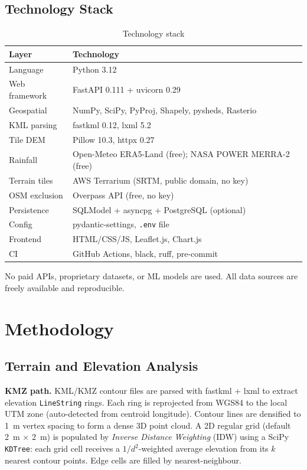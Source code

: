 \documentclass[manuscript,screen,review,nonacm]{acmart}
\begin{document}
\subsection{Technology Stack}

\begin{table}[h]
  \caption{Technology stack}
  \label{tab:stack}
  \begin{tabular}{p{2.5cm}p{4.7cm}}
    \toprule
    Layer & Technology \\
    \midrule
    Language & Python 3.12 \\
    Web framework & FastAPI 0.111 + uvicorn 0.29 \\
    Geospatial & NumPy, SciPy, PyProj, Shapely, pysheds, Rasterio \\
    KML parsing & fastkml 0.12, lxml 5.2 \\
    Tile DEM & Pillow 10.3, httpx 0.27 \\
    Rainfall & Open-Meteo ERA5-Land (free); NASA POWER MERRA-2 (free) \\
    Terrain tiles & AWS Terrarium (SRTM, public domain, no key) \\
    OSM exclusion & Overpass API (free, no key) \\
    Persistence & SQLModel + asyncpg + PostgreSQL (optional) \\
    Config & pydantic-settings, \texttt{.env} file \\
    Frontend & HTML/CSS/JS, Leaflet.js, Chart.js \\
    CI & GitHub Actions, black, ruff, pre-commit \\
    \bottomrule
  \end{tabular}
\end{table}

No paid APIs, proprietary datasets, or ML models are used. All data
sources are freely available and reproducible.

\section{Methodology}
\label{sec:methodology}

\subsection{Terrain and Elevation Analysis}

\textbf{KMZ path.} KML/KMZ contour files are parsed with fastkml + lxml
to extract elevation \texttt{LineString} rings. Each ring is reprojected
from WGS84 to the local UTM zone (auto-detected from centroid longitude).
Contour lines are densified to 1~m vertex spacing to form a dense 3D
point cloud. A 2D regular grid (default 2~m $\times$ 2~m) is populated
by \emph{Inverse Distance Weighting} (IDW) using a SciPy \texttt{KDTree}:
each grid cell receives a $1/d^2$-weighted average elevation from its $k$
nearest contour points. Edge cells are filled by nearest-neighbour.
\end{document}
